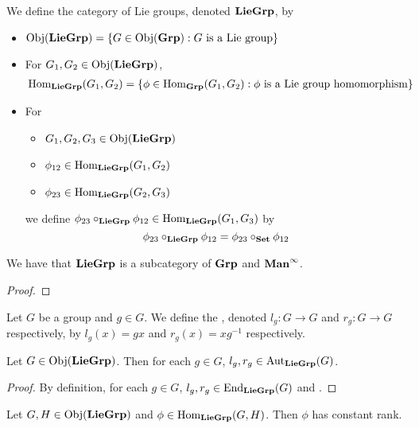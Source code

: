 \documentclass{book}
\begin{document}
\begin{defn}
	We define the category of Lie groups, denoted $\LieGrp$, by 
	\begin{itemize}
		\item $\Obj(\LieGrp) = \{G \in \Obj(\Grp): G \text{ is a Lie group} \}$ 
		\item For $G_1, G_2 \in \Obj(\LieGrp)$, 
		\begin{align*}
			& \Hom_{\LieGrp}(G_1, G_2) = \{\phi \in \Hom_{\Grp}(G_1, G_2): \phi \text{ is a Lie group homomorphism} \}
		\end{align*}
		\item For 
		\begin{itemize}
			\item $G_1, G_2, G_3 \in \Obj(\LieGrp)$ 
			\item $\phi_{12} \in \Hom_{\LieGrp}(G_1, G_2)$
			\item $\phi_{23} \in \Hom_{\LieGrp}(G_2, G_3)$
		\end{itemize}
		we define $ \phi_{23} \circ_{\LieGrp} \phi_{12} \in \Hom_{\LieGrp}(G_1, G_3)$ by 
		$$ \phi_{23} \circ_{\LieGrp} \phi_{12} = \phi_{23} \circ_{\Set} \phi_{12}$$
	\end{itemize}
\end{defn}

\begin{ex}
	We have that $\LieGrp$ is a subcategory of $\Grp$ and $\Maninf$.
\end{ex}

\begin{proof}
\end{proof}

\begin{defn}  
	Let $G$ be a group and $g \in G$. We define the , denoted $l_g:G \rightarrow G$ and $r_g:G \rightarrow G$ respectively, by $l_g(x) = gx$ and $r_g(x) = xg^{-1}$ respectively. 
\end{defn}

\begin{ex}
	Let $G \in \Obj(\LieGrp)$. Then for each $g \in G$, $l_g,r_g \in \Aut_{\LieGrp}(G)$.
\end{ex}

\begin{proof}
	By definition, for each $g \in G$, $l_g, r_g \in \End_{\LieGrp}(G)$ and .   
\end{proof}

\begin{ex}
	Let $G, H \in \Obj(\LieGrp)$ and $\phi \in \Hom_{\LieGrp}(G, H)$. Then $\phi$ has constant rank. 
\end{ex}
\end{document}
